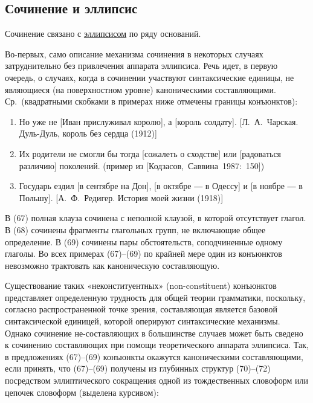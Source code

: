 \subsection{Сочинение и
эллипсис}\label{ux441ux43eux447ux438ux43dux435ux43dux438ux435-ux438-ux44dux43bux43bux438ux43fux441ux438ux441}

Сочинение связано с \underline{эллипсисом} по ряду оснований.

Во-первых, само описание механизма сочинения в некоторых случаях
затруднительно без привлечения аппарата эллипсиса. Речь идет, в первую
очередь, о случаях, когда в сочинении участвуют синтаксические единицы,
не являющиеся (на поверхностном уровне) каноническими составляющими.
Ср.~(квадратными скобками в примерах ниже отмечены границы конъюнктов):

\begin{enumerate}
\def\labelenumi{(\arabic{enumi})}
\setcounter{enumi}{66}
\item
  Но уже не {[}Иван прислуживал королю{]}, а {[}король солдату{]}.
  {[}Л.~А.~Чарская. Дуль-Дуль, король без сердца (1912){]}
\item
  Их родители не смогли бы тогда {[}сожалеть о сходстве{]} или
  {[}радоваться различию{]} поколений. (пример из
  {[}Кодзасов,~Саввина~1987:~150{]})
\item
  Государь ездил {[}в сентябре на Дон{]}, {[}в октябре ― в Одессу{]} и
  {[}в ноябре ― в Польшу{]}. {[}А.~Ф.~Редигер. История моей жизни
  (1918){]}
\end{enumerate}

В (67) полная клауза сочинена с неполной клаузой, в которой отсутствует
глагол. В (68) сочинены фрагменты глагольных групп, не включающие общее
определение. В (69) сочинены пары обстоятельств, соподчиненные одному
глаголы. Во всех примерах (67)--(69) по крайней мере один из конъюнктов
невозможно трактовать как каноническую составляющую.

Существование таких «неконституентных» (non-constituent) конъюнктов
представляет определенную трудность для общей теории грамматики,
поскольку, согласно распространенной точке зрения, составляющая является
базовой синтаксической единицей, которой оперируют синтаксические
механизмы. Однако сочинение не-составляющих в большинстве случаев может
быть сведено к сочинению составляющих при помощи теоретического аппарата
эллипсиса. Так, в предложениях (67)--(69) конъюнкты окажутся
каноническими составляющими, если принять, что (67)--(69) получены из
глубинных структур (70)--(72) посредством эллиптического сокращения
одной из тождественных словоформ или цепочек словоформ (выделена
курсивом):

